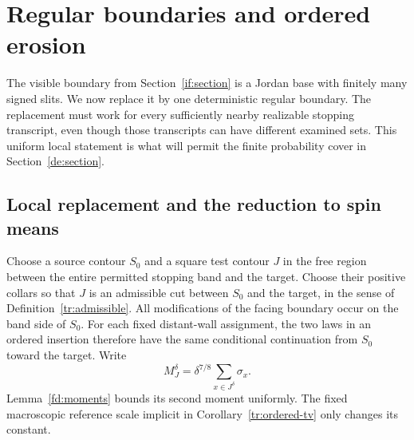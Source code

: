 \section{Regular boundaries and ordered erosion}\label{rg:section}

The visible boundary from Section~\ref{if:section} is a Jordan base
with finitely many signed slits. We now replace it by one deterministic
regular boundary. The replacement must work for every sufficiently
nearby realizable stopping transcript, even though those transcripts
can have different examined sets. This uniform local statement is what
will permit the finite probability cover in Section~\ref{de:section}.

\subsection{Local replacement and the reduction to spin means}

Choose a source contour $S_0$ and a square test contour $J$ in the free
region between the entire permitted stopping band and the target.
Choose their positive collars so that $J$ is an admissible cut between
$S_0$ and the target, in the sense of Definition~\ref{tr:admissible}.
All modifications of the facing boundary occur on the band side of
$S_0$. For each fixed distant-wall assignment, the two laws in an
ordered insertion therefore have the same conditional continuation
from $S_0$ toward the target. Write
\begin{equation}\label{if:line-mean}
                 M_J^\delta=\delta^{7/8}\sum_{x\in J^\delta}\sigma_x.
\end{equation}
Lemma~\ref{fd:moments} bounds its second moment uniformly. The fixed
macroscopic reference scale implicit in Corollary~\ref{tr:ordered-tv}
only changes its constant.

